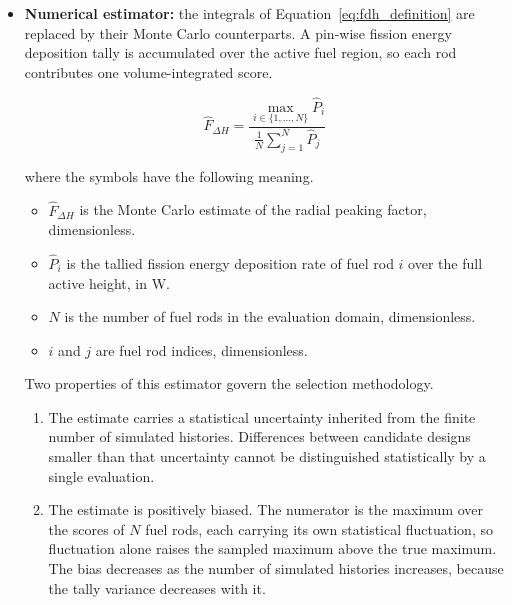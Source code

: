 \begin{itemize}
  \item \textbf{Numerical estimator:} the integrals of
        Equation~\eqref{eq:fdh_definition} are replaced by
their Monte Carlo counterparts. A pin-wise fission energy deposition
tally is accumulated over the active fuel region, so each rod
contributes one volume-integrated score.

\begin{equation}
\widehat{F}_{\Delta H}
=
\frac{\displaystyle \max_{i \in \{1,\dots,N\}} \widehat{P}_i}
     {\displaystyle \frac{1}{N} \sum_{j=1}^{N} \widehat{P}_j}
\label{eq:fdh_estimator}
\end{equation}

\noindent where the symbols have the following meaning.

\begin{itemize}
  \item $\widehat{F}_{\Delta H}$ is the Monte Carlo estimate of the
        radial peaking factor, dimensionless.

  \item $\widehat{P}_i$ is the tallied fission energy deposition rate
        of fuel rod $i$ over the full active height, in W.

  \item $N$ is the number of fuel rods in the evaluation domain,
        dimensionless.

  \item $i$ and $j$ are fuel rod indices, dimensionless.
\end{itemize}

Two properties of this estimator govern the selection methodology.

\begin{enumerate}
  \item The estimate carries a statistical uncertainty inherited from
        the finite number of simulated histories. Differences between
        candidate designs smaller than that uncertainty cannot be
        distinguished statistically by a single evaluation.

  \item The estimate is positively biased. The numerator is the
        maximum over the scores of $N$ fuel rods, each carrying its own
        statistical fluctuation, so fluctuation alone raises the sampled
        maximum above the true maximum. The bias decreases as the
        number of simulated histories increases, because the tally
        variance decreases with it.
\end{enumerate}


\end{itemize}
